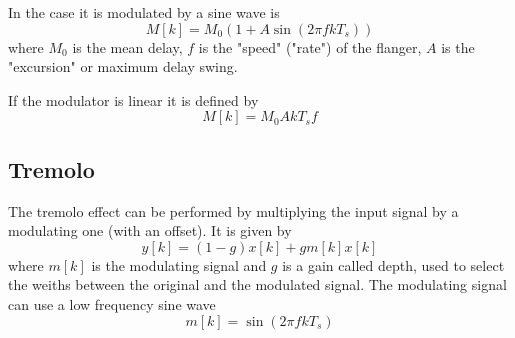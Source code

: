 \documentclass[11pt]{article}
\begin{document}
In the case it is modulated by a sine wave is
\begin{equation}
	M[k] = M_0 (1 + A\sin{(2\pi fkT_s)})
\end{equation}
where $M_0$ is the mean delay, $f$ is the "speed" ("rate") of the flanger, $A$ is the "excursion" or maximum delay swing. 

If the modulator is linear it is defined by
\begin{equation}
	M[k] = M_0AkT_sf
\end{equation}


\subsection{Tremolo}

The tremolo effect can be performed by multiplying the input signal by a modulating one (with an offset). It is given by
\begin{equation}
	y[k] = (1-g) x[k] + gm[k]x[k]
\end{equation}
where $m[k]$ is the modulating signal and $g$ is a gain called depth, used to select the weiths between the original and the modulated signal. The modulating signal can use a low frequency sine wave
\begin{equation}
	m[k] = \sin(2\pi fkT_s)
\end{equation}
\end{document}
